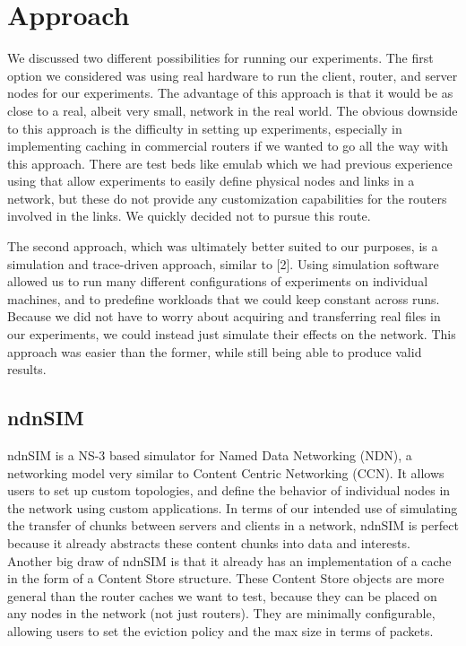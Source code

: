 \section{Approach} \label{sec:approach}
We discussed two different possibilities for running our experiments. The first
option we considered was using real hardware to run the client, router, and
server nodes for our experiments. The advantage of this approach is that it
would be as close to a real, albeit very small, network in the real world. The
obvious downside to this approach is the difficulty in setting up experiments,
especially in implementing caching in commercial routers if we wanted to go all
the way with this approach. There are test beds like emulab which we had
previous experience using that allow experiments to easily define physical nodes
and links in a network, but these do not provide any customization capabilities
for the routers involved in the links. We quickly decided not to pursue this
route.

The second approach, which was ultimately better suited to our purposes, is a
simulation and trace-driven approach, similar to [2]. Using simulation software
allowed us to run many different configurations of experiments on individual
machines, and to predefine workloads that we could keep constant across runs.
Because we did not have to worry about acquiring and  transferring real files in
our experiments, we could instead just simulate their effects on the network.
This approach was easier than the former, while still being able to produce
valid results.

\subsection{ndnSIM} \label{sec:ndnSIM}
ndnSIM is a NS-3 based simulator for Named Data Networking (NDN), a networking
model very similar to Content Centric Networking (CCN). It allows users to set
up custom topologies, and define the behavior of individual nodes in the network
using custom applications. In terms of our intended use of simulating the
transfer of chunks between servers and clients in a network, ndnSIM is perfect
because it already abstracts these content chunks into data and interests.
Another big draw of ndnSIM is that it already has an implementation of a cache
in the form of a Content Store structure. These Content Store objects are more
general than the router caches we want to test, because they can be placed on
any nodes in the network (not just routers). They are minimally configurable,
allowing users to set the eviction policy and the max size in terms of packets. 
